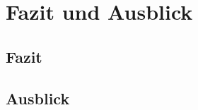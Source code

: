 \chapter{Fazit und Ausblick}
\label{cha:Fazit_und_Ausblick}


\section{Fazit}
\label{cha:Fa_und_Aus:sec:Fazit}



\section{Ausblick}
\label{cha:Fa_und_Aus:sec:Ausblick}